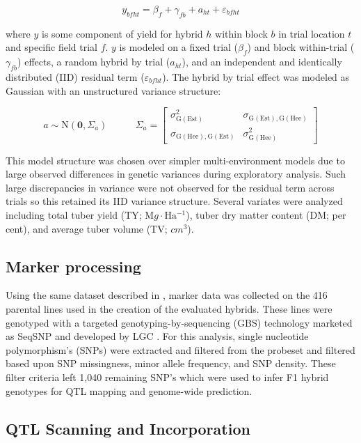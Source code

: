 \begin{refsection}
\begin{equation} \label{eq-blup-model}
y_{bfht} = \beta_f +\gamma_{fb} + a_{ht} + \varepsilon_{bfht}
\end{equation}

where \(y\) is some component of yield for hybrid \(h\) within block
\(b\) in trial location \(t\) and specific field trial \(f\). \(y\) is
modeled on a fixed trial (\(\beta_f\)) and block within-trial
(\(\gamma_{fb}\)) effects, a random hybrid by trial (\(a_{ht}\)), and an
independent and identically distributed (IID) residual term
(\(\varepsilon_{bfht}\)). The hybrid by trial effect was modeled as
Gaussian with an unstructured variance structure:

\[a \sim \mathrm{N} \left (\mathbf{0},  \Sigma_a \right )  ~~~~~~~~~~~~~  \Sigma_a =\begin{bmatrix} \sigma^2_{\mathrm{G(Est)}} &  \sigma_{\mathrm{G(Est),G(Hee)}}\\ \sigma_{\mathrm{G(Hee),G(Est)}} & \sigma^2_{\mathrm{G(Hee)}}\end{bmatrix}\]

This model structure was chosen over simpler multi-environment models
due to large observed differences in genetic variances during
exploratory analysis. Such large discrepancies in variance were not
observed for the residual term across trials so this retained its IID
variance structure. Several variates were analyzed including
total tuber yield (TY; \(\mathrm Mg \cdot \mathrm{Ha^{-1}}\)), tuber dry
matter content (DM; per cent), and average tuber volume (TV; \(cm^3\)).

\subsection{Marker processing}\label{marker-processing}

Using the same dataset described in \parencite{Adams2023}, marker data
was collected on the 416 parental lines used in the creation of the
evaluated hybrids. These lines were genotyped with a targeted
genotyping-by-sequencing (GBS) technology marketed as SeqSNP and
developed by LGC \parencite{LGC2019}. For this analysis, single
nucleotide polymorphism's (SNPs) were extracted and filtered from the
probeset and filtered based upon SNP missingness, minor allele
frequency, and SNP density. These filter criteria left 1,040 remaining
SNP's which were used to infer F1 hybrid genotypes for QTL mapping and
genome-wide prediction.

\subsection{QTL Scanning and
Incorporation}\label{qtl-scanning-and-incorporation}


\end{refsection}

